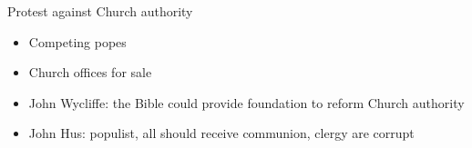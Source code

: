 \begin{frame}[label=sec-2-6]{Protest against Church authority}
\begin{itemize}
\item Competing popes
\item Church offices for sale
\item John Wycliffe: the Bible could provide foundation to reform Church authority
\item John Hus: populist, all should receive communion, clergy are corrupt
\end{itemize}
\end{frame}

